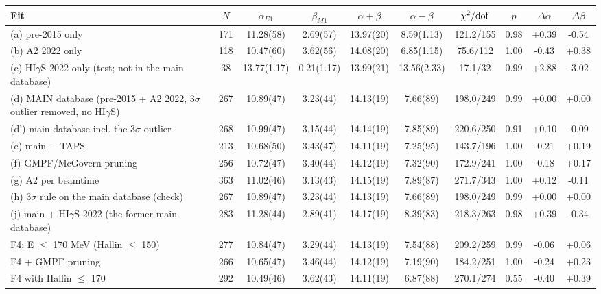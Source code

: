 \begin{tabular}{lccccccccc}
\hline
Fit & $N$ & $\alpha_{E1}$ & $\beta_{M1}$ & $\alpha+\beta$ & $\alpha-\beta$ & $\chi^2/{\rm dof}$ & $p$ & $\Delta\alpha$ & $\Delta\beta$ \\
\hline
(a) pre-2015 only & 171 & 11.28(58) & 2.69(57) & 13.97(20) & 8.59(1.13) & 121.2/155 & 0.98 & +0.39 & -0.54 \\
(b) A2 2022 only & 118 & 10.47(60) & 3.62(56) & 14.08(20) & 6.85(1.15) & 75.6/112 & 1.00 & -0.43 & +0.38 \\
(c) HI$\gamma$S 2022 only (test; not in the main database) & 38 & 13.77(1.17) & 0.21(1.17) & 13.99(21) & 13.56(2.33) & 17.1/32 & 0.99 & +2.88 & -3.02 \\
(d) MAIN database (pre-2015 + A2 2022, 3$\sigma$ outlier removed, no HI$\gamma$S) & 267 & 10.89(47) & 3.23(44) & 14.13(19) & 7.66(89) & 198.0/249 & 0.99 & +0.00 & +0.00 \\
(d') main database incl. the 3$\sigma$ outlier & 268 & 10.99(47) & 3.15(44) & 14.14(19) & 7.85(89) & 220.6/250 & 0.91 & +0.10 & -0.09 \\
(e) main $-$ TAPS & 213 & 10.68(50) & 3.43(47) & 14.11(19) & 7.25(95) & 143.7/196 & 1.00 & -0.21 & +0.19 \\
(f) GMPF/McGovern pruning & 256 & 10.72(47) & 3.40(44) & 14.12(19) & 7.32(90) & 172.9/241 & 1.00 & -0.18 & +0.17 \\
(g) A2 per beamtime & 363 & 11.02(46) & 3.13(43) & 14.15(19) & 7.89(87) & 271.7/343 & 1.00 & +0.12 & -0.11 \\
(h) 3$\sigma$ rule on the main database (check) & 267 & 10.89(47) & 3.23(44) & 14.13(19) & 7.66(89) & 198.0/249 & 0.99 & +0.00 & +0.00 \\
(j) main + HI$\gamma$S 2022 (the former main database) & 283 & 11.28(44) & 2.89(41) & 14.17(19) & 8.39(83) & 218.3/263 & 0.98 & +0.39 & -0.34 \\
F4: E $\le$ 170 MeV (Hallin $\le$ 150) & 277 & 10.84(47) & 3.29(44) & 14.13(19) & 7.54(88) & 209.2/259 & 0.99 & -0.06 & +0.06 \\
F4 + GMPF pruning & 266 & 10.65(47) & 3.46(44) & 14.12(19) & 7.19(90) & 184.2/251 & 1.00 & -0.24 & +0.23 \\
F4 with Hallin $\le$ 170 & 292 & 10.49(46) & 3.62(43) & 14.11(19) & 6.87(88) & 270.1/274 & 0.55 & -0.40 & +0.39 \\
\hline
\end{tabular}

